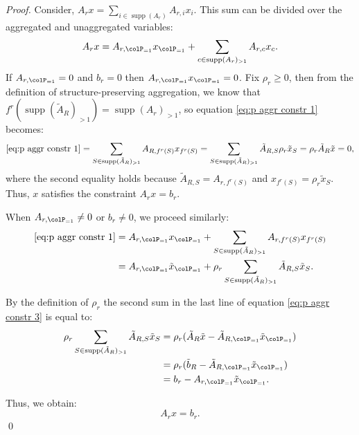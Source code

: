 \documentclass[smallextended,natbib]{svjour3}       %
\DeclareMathOperator{\supp}{supp}
\numberwithin{definition}{section}
\numberwithin{theorem}{section}
\numberwithin{proposition}{section}
\begin{document}
\begin{proof}

 Consider, \(A_r x = \sum_{i \in \supp(A_r)} A_{r,i} x_i\). 
  This sum can be divided over the aggregated and unaggregated variables:
  \begin{equation}
    \label{eq:p aggr constr 1}
    A_r x =  A_{r, \colP_{=1}} x_{\colP_{=1}} + \sum_{c \in \supp(A_r)_{>1}}  A_{r, c} x_{c}  .
  \end{equation}
  If \(A_{r, \colP_{=1}} = 0\) and \(b_r = 0\) then \( A_{r, \colP_{=1}} x_{\colP_{=1}} = 0\). Fix \(\rho_r \geq 0\), then
  from the definition of structure-preserving aggregation, we know that \(f^r(\supp(\tilde{A}_R)_{>1}) = \supp(A_r)_{>1}\), so equation \eqref{eq:p aggr constr 1} becomes:
  \begin{equation}
    \label{eq:p aggr constr 2}
    \eqref{eq:p aggr constr 1} = \sum_{S \in \supp(\tilde{A}_R)_{>1}} A_{R, f^r(S)} x_{f^r(S)} =  \sum_{S \in \supp(\tilde{A}_R)_{>1}} \tilde{A}_{R, S} \rho_r \tilde{x}_S  = \rho_r \tilde{A}_R \tilde{x} = 0,
  \end{equation}
  where the second equality holds because \(\tilde{A}_{R, S} = A_{r, f^r(S)}\) and \(x_{f^r(S)} = \rho_r \tilde{x}_S\). Thus, \(x\) satisfies the constraint \(A_r x = b_r\).
  
  When \(A_{r, \colP_{=1}} \neq 0\) or \(b_r \neq 0\), we proceed similarly:
  \begin{align}
  \label{eq:p aggr constr 3}
 \eqref{eq:p aggr constr 1} &=A_{r, \colP_{=1}} x_{\colP_{=1}} + \sum_{S \in \supp(\tilde{A}_R)_{>1}} A_{r, f^r(S)} x_{f^r(S)}  \\
  &=  A_{r, \colP_{=1}} \tilde{x}_{\colP_{=1}} + \rho_r \sum_{S \in \supp(\tilde{A}_R)_{>1}} \tilde{A}_{R, S}  \tilde{x}_S.
  \end{align}
  
  By the definition of \(\rho_r\) the second sum in the last line of equation \eqref{eq:p aggr constr 3} is equal to:
  \begin{align*}
  \rho_r \sum_{S \in \supp(\tilde{A}_R)_{>1}} \tilde{A}_{R, S} \tilde{x}_S 
  &= \rho_r (\tilde{A}_R \tilde{x} - \tilde{A}_{R, \colP_{=1}} \tilde{x}_{\colP_{=1}}) \\
  &= \rho_r (\tilde{b}_R - \tilde{A}_{R, \colP_{=1}} \tilde{x}_{\colP_{=1}}) \\
  &= b_r - A_{r, \colP_{=1}} \tilde{x}_{\colP_{=1}}.
  \end{align*}
  
  Thus, we obtain:
  \[
  A_r x = b_r.
  \]
  \qed
  \end{proof}
\end{document}
